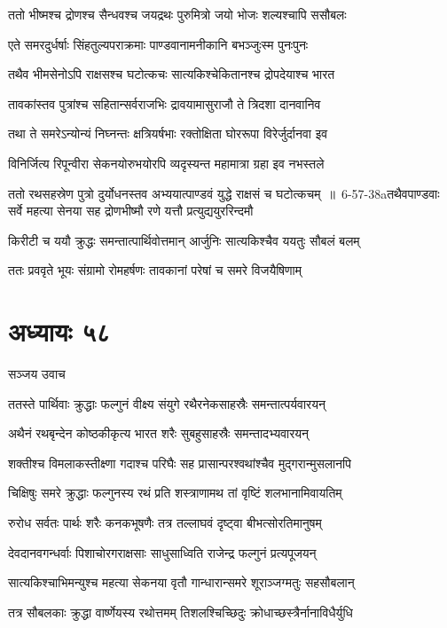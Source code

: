 \twolineshloka
{ततो भीष्मश्च द्रोणश्च सैन्धवश्च जयद्रथः}
{पुरुमित्रो जयो भोजः शल्यश्चापि ससौबलः}


\twolineshloka
{एते समरदुर्धर्षाः सिंहतुल्यपराक्रमाः}
{पाण्डवानामनीकानि बभञ्जुःस्म पुनःपुनः}


\twolineshloka
{तथैव भीमसेनोऽपि राक्षसश्च घटोत्कचः}
{सात्यकिश्चेकितानश्च द्रोपदेयाश्च भारत}


\twolineshloka
{तावकांस्तव पुत्रांश्च सहितान्सर्वराजभिः}
{द्रावयामासुराजौ ते त्रिदशा दानवानिव}


\twolineshloka
{तथा ते समरेऽन्योन्यं निघ्नन्तः क्षत्रियर्षभाः}
{रक्तोक्षिता घोररूपा विरेर्जुर्दानवा इव}


\twolineshloka
{विनिर्जित्य रिपून्वीरा सेकनयोरुभयोरपि}
{व्यदृस्यन्त महामात्रा ग्रहा इव नभस्तले}


\threelineshloka
{ततो रथसहस्रेण पुत्रो दुर्योधनस्तव}
{अभ्ययात्पाण्डवं युद्धे राक्षसं च घटोत्कचम् ॥ 6-57-38aतथैवपाण्डवाः सर्वे महत्या सेनया सह}
{द्रोणभीष्मौ रणे यत्तौ प्रत्युद्ययुररिन्दमौ}


\twolineshloka
{किरीटी च ययौ क्रुद्धः समन्तात्पार्थिवोत्तमान्}
{आर्जुनिः सात्यकिश्चैव ययतुः सौबलं बलम्}


\twolineshloka
{ततः प्रववृते भूयः संग्रामो रोमहर्षणः}
{तावकानां परेषां च समरे विजयैषिणाम्}


\chapter{अध्यायः ५८}
\twolineshloka
{सञ्जय उवाच}
{}


\twolineshloka
{ततस्ते पार्थिवाः क्रुद्धाः फल्गुनं वीक्ष्य संयुगे}
{रथैरनेकसाहस्रैः समन्तात्पर्यवारयन्}


\twolineshloka
{अथैनं रथबृन्देन कोष्ठकीकृत्य भारत}
{शरैः सुबहुसाहस्रैः समन्तादभ्यवारयन्}


\twolineshloka
{शक्तीश्च विमलाकस्तीक्ष्णा गदाश्च परिघैः सह}
{प्रासान्परश्वथांश्चैव मुद्गरान्मुसलानपि}


\twolineshloka
{चिक्षिषुः समरे क्रुद्धाः फल्गुनस्य रथं प्रति}
{शस्त्राणामथ तां वृष्टिं शलभानामिवायतिम्}


\twolineshloka
{रुरोध सर्वतः पार्थः शरैः कनकभूषणैः}
{तत्र तल्लाघवं दृष्ट्वा बीभत्सोरतिमानुषम्}


\twolineshloka
{देवदानवगन्धर्वाः पिशाचोरगराक्षसाः}
{साधुसाध्विति राजेन्द्र फल्गुनं प्रत्यपूजयन्}


\twolineshloka
{सात्यकिश्चाभिमन्युश्च महत्या सेकनया वृतौ}
{गान्धारान्समरे शूराञ्जग्मतुः सहसौबलान्}


\twolineshloka
{तत्र सौबलकाः क्रुद्धा वार्ष्णेयस्य रथोत्तमम्}
{तिशलश्चिच्छिदुः क्रोधाच्छस्त्रैर्नानाविधैर्युधि}


